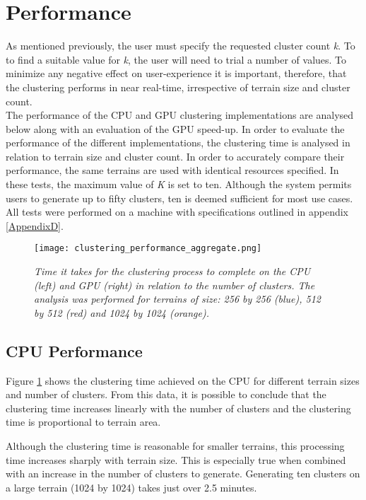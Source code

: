 \section{Performance}

As mentioned previously, the user must specify the requested cluster count \textit{k}. To to find a suitable value for \textit{k}, the user will need to trial a number of values. To minimize any negative effect on user-experience it is important, therefore, that the clustering performs in near real-time, irrespective of terrain size and cluster count.\\

The performance of the CPU and GPU clustering implementations are analysed below along with an evaluation of the GPU speed-up. In order to evaluate the performance of the different implementations, the clustering time is analysed in relation to terrain size and cluster count. In order to accurately compare their performance, the same terrains are used with identical resources specified. In these tests, the maximum value of \textit{K} is set to ten. Although the system permits users to generate up to fifty clusters, ten is deemed sufficient for most use cases. All tests were performed on a machine with specifications outlined in appendix \ref{AppendixD}.

\begin{figure}
\center
	\texttt{[image: clustering\_performance\_aggregate.png]}
	\caption{ \textit{Time it takes for the clustering process to complete on the CPU (left) and GPU (right) in relation to the number of clusters. The analysis was performed for terrains of size: 256 by 256 (blue), 512 by 512 (red) and 1024 by 1024 (orange).}}	
	\label{fig:aggregate_clustering_performance}
\end{figure}

\subsection{CPU Performance}

Figure \ref{fig:aggregate_clustering_performance} shows the clustering time achieved on the CPU for different terrain sizes and number of clusters. From this data, it is possible to conclude that the clustering time increases linearly with the number of clusters and the clustering time is proportional to terrain area.

Although the clustering time is reasonable for smaller terrains, this processing time increases sharply with terrain size. This is especially true when combined with an increase in the number of clusters to generate. Generating ten clusters on a large terrain (1024 by 1024) takes just over 2.5 minutes.


